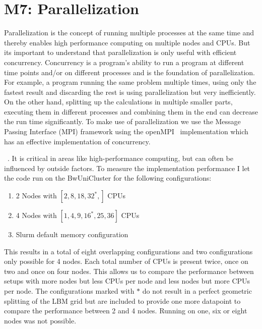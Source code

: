 \documentclass[a4paper,12pt, oneside]{book}
\begin{document}
\section{M7: Parallelization}
Parallelization is the concept of running multiple processes at the same time and thereby enables high performance computing on multiple nodes and CPUs. 
But its important to understand that parallelization is only useful with efficient concurrency. 
Concurrency is a program's ability to run a program at different time points and/or on different processes and is the foundation of parallelization.
For example, a program running the same problem multiple times, using only the fastest result and discarding the rest is using parallelization but very inefficiently.
On the other hand, splitting up the calculations in multiple smaller parts, executing them in different processes and combining them in the end can decrease the run time significantly.
To make use of parallelization we use the Message Passing Interface (MPI) framework using the openMPI~\cite{gabriel04:_open_mpi} implementation which has an effective implementation of concurrency.

~\cite{beyer2019-benchmark}.
It is critical in areas like high-performance computing, but can often be influenced by outside factors.  
To measure the implementation performance I let the code run on the BwUniCluster for the following configurations:
\begin{enumerate}
    \item 2 Nodes with $[2, 8, 18, 32^{*},]$ CPUs
    \item 4 Nodes with $[1, 4, 9, 16^{*}, 25, 36]$ CPUs
    \item Slurm default memory configuration
\end{enumerate}
This results in a total of eight overlapping configurations and two configurations only possible for 4 nodes. Each total number of CPUs is present twice, once on two and once on four nodes. 
This allows us to compare the performance between setups with more nodes but less CPUs per node and less nodes but more CPUs per node.
The configurations marked with $*$ do not result in a perfect geometric splitting of the LBM grid but are included to provide one more datapoint to compare the performance between 2 and 4 nodes.
Running on one, six or eight nodes was not possible.
\end{document}
